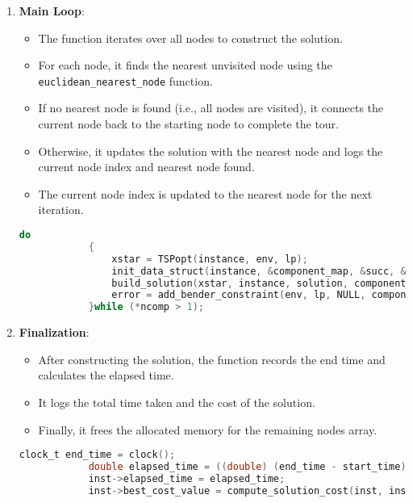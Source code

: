 \documentclass{article}
\begin{document}
\begin{enumerate}
	\item \textbf{Main Loop}:
	      \begin{itemize}
		      \item The function iterates over all nodes to construct the solution.
		      \item For each node, it finds the nearest unvisited node using the \texttt{euclidean\_nearest\_node} function.
		      \item If no nearest node is found (i.e., all nodes are visited), it connects the current node back to the starting node to complete the tour.
		      \item Otherwise, it updates the solution with the nearest node and logs the current node index and nearest node found.
		      \item The current node index is updated to the nearest node for the next iteration.
	      \end{itemize}
		  \begin{lstlisting}[language=C]
			do
			{
				xstar = TSPopt(instance, env, lp);
				init_data_struct(instance, &component_map, &succ, &ncomp);
				build_solution(xstar, instance, solution, component_map, ncomp);
				error = add_bender_constraint(env, lp, NULL, component_map, instance, *ncomp);
			}while (*ncomp > 1);
		  \end{lstlisting}

	\item \textbf{Finalization}:
	      \begin{itemize}
		      \item After constructing the solution, the function records the end time and calculates the elapsed time.
		      \item It logs the total time taken and the cost of the solution.
		      \item Finally, it frees the allocated memory for the remaining nodes array.
	      \end{itemize}
		\begin{lstlisting}[language=C]
			clock_t end_time = clock();
			double elapsed_time = ((double) (end_time - start_time)) / CLOCKS_PER_SEC;
			inst->elapsed_time = elapsed_time;
			inst->best_cost_value = compute_solution_cost(inst, inst->solution);
		\end{lstlisting}
\end{enumerate}
\end{document}
